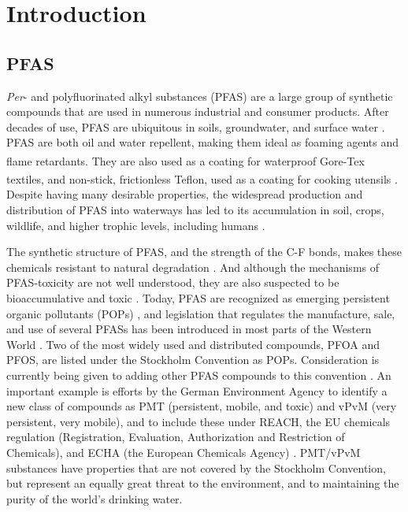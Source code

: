 \chapter{Introduction}\label{chap:intro}

\section{PFAS}
\textit{Per}- and polyfluorinated alkyl substances (PFAS) are a large group of synthetic compounds that are used in numerous industrial and consumer products. After decades of use, PFAS are ubiquitous in soils, groundwater, and surface water \citep{rankin2016north}. PFAS are both oil and water repellent, making them ideal as foaming agents and flame retardants. They are also used as a coating for waterproof Gore-Tex\textsuperscript{\textregistered} textiles, and non-stick, frictionless Teflon\textsuperscript{\texttrademark}, used as a coating for cooking utensils \citep{du2014adsorption}. Despite having many desirable properties, the widespread production and distribution of PFAS into waterways has led to its accumulation in soil, crops, wildlife, and higher trophic levels, including humans \citep{bhhatarai2011,Lau2007}. 

The synthetic structure of PFAS, and the strength of the C-F bonds, makes these chemicals resistant to natural degradation \citep{krafft2015per}. And although the mechanisms of PFAS-toxicity are not well understood, they are also suspected to be bioaccumulative and toxic \citep{ding2013physicochemical,Lau2007}. Today, PFAS are recognized as emerging persistent organic pollutants (POPs) \citep{ECHA2020}, and legislation that regulates the manufacture, sale, and use of several PFASs has been introduced in most parts of the Western World \citep{EPA2014,EC2020PFAS}. Two of the most widely used and distributed compounds, PFOA and PFOS, are listed under the Stockholm Convention as \acrshort{POPs}. Consideration is currently being given to adding other PFAS compounds to this convention \citep{EC2020PFAS}. An important example is efforts by the German Environment Agency to identify a new class of compounds as PMT (persistent, mobile, and toxic) and vPvM (very persistent, very mobile), and to include these under REACH, the EU chemicals regulation (Registration, Evaluation, Authorization and Restriction of Chemicals), and ECHA (the European Chemicals Agency) \citep{hale2020persistent}. \acrshort{PMT}/\acrshort{vPvM} substances have properties that are not covered by the Stockholm Convention, but represent an equally great threat to the environment, and to maintaining the purity of the world's drinking water.

